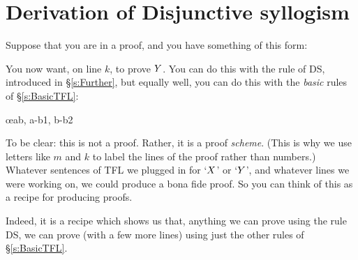 \section{Derivation of Disjunctive syllogism}
Suppose that you are in a proof, and you have something of this form:
\begin{pf}
\end{pf}
You now want, on line $k$, to prove $Y$. You can do this with the rule of DS, introduced in \S\ref{s:Further}, but equally well, you can do this with the \emph{basic} rules of \S\ref{s:BasicTFL}:
	\begin{pf}
		\open
		\close
		\open
		\close
	\oe{ab, a-b1, b-b2}
\end{pf}

To be clear: this is not a proof. Rather, it is a proof \emph{scheme}.
(This is why we use letters like $m$ and $k$ to label the lines of the proof rather than numbers.)
Whatever sentences of TFL we plugged in for `$X$' or `$Y$', and whatever lines we were working on, we could produce a bona fide proof. So you can think of this as a recipe for producing proofs.

Indeed, it is a recipe which shows us that, anything we can prove using the rule DS, we can prove (with a few more lines) using just the other rules of \S\ref{s:BasicTFL}.
%

